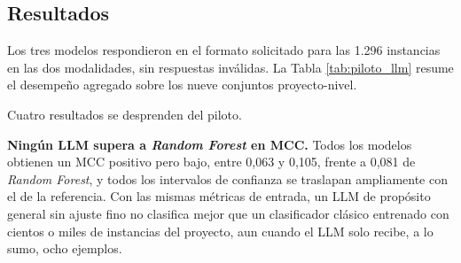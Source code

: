 \subsection{Resultados}

Los tres modelos respondieron en el formato solicitado para las 1.296 instancias en las dos modalidades, sin respuestas inválidas. La Tabla \ref{tab:piloto_llm} resume el desempeño agregado sobre los nueve conjuntos proyecto-nivel.

\begin{table}[H]
\centering
\caption{Piloto con LLM: desempeño sobre 1.296 instancias de BugHunter (\textit{oryx}, \textit{antlr4} y \textit{netty}, tres niveles), con intervalos de confianza del 95\,\% por \textit{bootstrap}}
\label{tab:piloto_llm}
\end{table}

Cuatro resultados se desprenden del piloto.

\textbf{Ningún LLM supera a \textit{Random Forest} en MCC.} Todos los modelos obtienen un MCC positivo pero bajo, entre 0,063 y 0,105, frente a 0,081 de \textit{Random Forest}, y todos los intervalos de confianza se traslapan ampliamente con el de la referencia. Con las mismas métricas de entrada, un LLM de propósito general sin ajuste fino no clasifica mejor que un clasificador clásico entrenado con cientos o miles de instancias del proyecto, aun cuando el LLM solo recibe, a lo sumo, ocho ejemplos.

